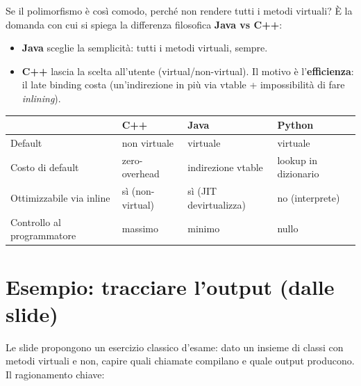 \documentclass{report}
\begin{document}
Se il polimorfismo è così comodo, perché non rendere tutti i metodi virtuali?
È la domanda con cui si spiega la differenza filosofica \textbf{Java vs C++}:

\begin{itemize}
    \item \textbf{Java} sceglie la semplicità: tutti i metodi virtuali, sempre.
    \item \textbf{C++} lascia la scelta all'utente (virtual/non-virtual). Il
    motivo è l'\textbf{efficienza}: il late binding costa (un'indirezione in
    più via vtable + impossibilità di fare \emph{inlining}).
\end{itemize}


\begin{center}
\renewcommand{\arraystretch}{1.35}
\footnotesize
\begin{tabular}{|>{\raggedright\arraybackslash}p{3.4cm}|>{\raggedright\arraybackslash}p{3.4cm}|>{\raggedright\arraybackslash}p{3.4cm}|>{\raggedright\arraybackslash}p{3.0cm}|}
\hline
 & \textbf{C++} & \textbf{Java} & \textbf{Python} \\
\hline
Default & non virtuale & virtuale & virtuale \\
\hline
Costo di default & zero-overhead & indirezione vtable & lookup in dizionario \\
\hline
Ottimizzabile via inline & sì (non-virtual) & sì (JIT devirtualizza) & no (interprete) \\
\hline
Controllo al programmatore & massimo & minimo & nullo \\
\hline
\end{tabular}
\end{center}

\section{Esempio: tracciare l'output (dalle slide)}

Le slide propongono un esercizio classico d'esame: dato un insieme di classi
con metodi virtuali e non, capire quali chiamate compilano e quale output
producono. Il ragionamento chiave:
\end{document}
